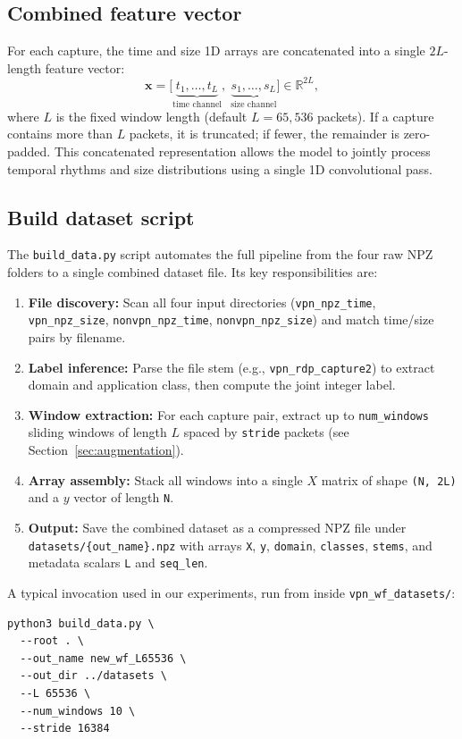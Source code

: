 \documentclass[letterpaper,twocolumn,10pt]{article}
\begin{document}
\subsection{Combined feature vector}
For each capture, the time and size 1D arrays are concatenated into a single $2L$-length feature vector:
\[
\mathbf{x} = \bigl[\underbrace{t_1, \ldots, t_L}_{\text{time channel}},\; \underbrace{s_1, \ldots, s_L}_{\text{size channel}}\bigr] \in \mathbb{R}^{2L},
\]
where $L$ is the fixed window length (default $L = 65{,}536$ packets). If a capture contains more than $L$ packets, it is truncated; if fewer, the remainder is zero-padded. This concatenated representation allows the model to jointly process temporal rhythms and size distributions using a single 1D convolutional pass.

\subsection{Build dataset script}
The \texttt{build\_data.py} script automates the full pipeline from the four raw NPZ folders to a single combined dataset file. Its key responsibilities are:

\begin{enumerate}[leftmargin=1.2em]
  \item \textbf{File discovery:} Scan all four input directories (\texttt{vpn\_npz\_time}, \texttt{vpn\_npz\_size}, \texttt{nonvpn\_npz\_time}, \texttt{nonvpn\_npz\_size}) and match time/size pairs by filename.
  \item \textbf{Label inference:} Parse the file stem (e.g., \texttt{vpn\_rdp\_capture2}) to extract domain and application class, then compute the joint integer label.
  \item \textbf{Window extraction:} For each capture pair, extract up to \texttt{num\_windows} sliding windows of length $L$ spaced by \texttt{stride} packets (see Section~\ref{sec:augmentation}).
  \item \textbf{Array assembly:} Stack all windows into a single $X$ matrix of shape \texttt{(N, 2L)} and a $y$ vector of length \texttt{N}.
  \item \textbf{Output:} Save the combined dataset as a compressed NPZ file under \texttt{datasets/\{out\_name\}.npz} with arrays \texttt{X}, \texttt{y}, \texttt{domain}, \texttt{classes}, \texttt{stems}, and metadata scalars \texttt{L} and \texttt{seq\_len}.
\end{enumerate}

A typical invocation used in our experiments, run from inside \texttt{vpn\_wf\_datasets/}:
\begin{verbatim}
python3 build_data.py \
  --root . \
  --out_name new_wf_L65536 \
  --out_dir ../datasets \
  --L 65536 \
  --num_windows 10 \
  --stride 16384
\end{verbatim}
\end{document}
